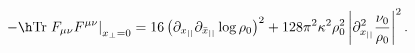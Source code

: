 \begin{equation}
\label{actiondensity}
-\h \hbox{Tr} \left.F_{\mu\nu}F^{\mu\nu}\right|_{x_\perp=0}=
16\left(\partial_{x_{||}}\partial_{\bar x_{||}}\log\rho_0
\right)^2+
128\pi^2\kappa^2\rho^2_0\left|
\partial_{x_{||}}^2\frac{\nu_0}{\rho_0}\right|^2.
\end{equation}


